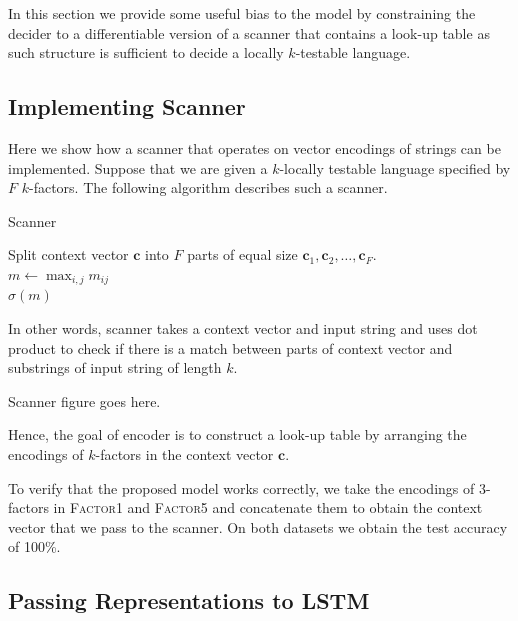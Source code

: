 \documentclass[titlepage]{report}
\begin{document}
In this section we provide some useful bias to the model by constraining the decider to a differentiable version of a scanner that contains a look-up table as such structure is sufficient to decide a locally $k$-testable language.

\subsection{Implementing Scanner}

Here we show how a scanner that operates on vector encodings of strings can be implemented. Suppose that we are given a $k$-locally testable language specified by $F$ $k$-factors. The following algorithm describes such a scanner.

\normalem
\begin{algorithm}
\caption{Scanner}
Split context vector $\mathbf{c}$ into $F$ parts of equal size $\mathbf{c}_1, \mathbf{c}_2, \ldots, \mathbf{c}_F$. \\
$m \leftarrow \max_{i, j} m_{ij}$ \\
\Return $\sigma(m)$
\end{algorithm}
\ULforem

\noindent
In other words, scanner takes a context vector and input string and uses dot product to check if there is a match between parts of context vector and substrings of input string of length $k$.

\begin{center}
Scanner figure goes here.
\end{center}

\noindent
Hence, the goal of encoder is to construct a look-up table by arranging the encodings of $k$-factors in the context vector $\mathbf{c}$.

To verify that the proposed model works correctly, we take the encodings of 3-factors in \textsc{Factor1} and \textsc{Factor5} and concatenate them to obtain the context vector that we pass to the scanner. On both datasets we obtain the test accuracy of 100\%.

\subsection{Passing Representations to LSTM}
\end{document}
